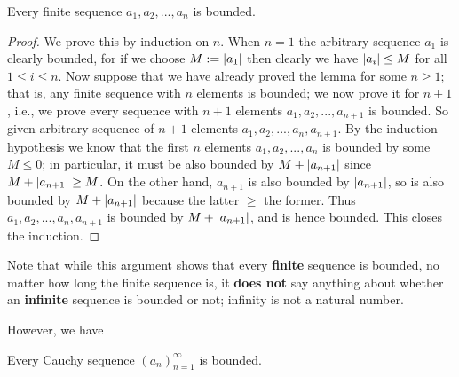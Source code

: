 \begin{lemma}  \label{lem 5.1.14}
Every finite sequence \(a_1, a_2, ..., a_n\) is bounded.
\end{lemma}

\begin{proof}
We prove this by induction on \(n\).
When \(n = 1\) the arbitrary sequence \(a_1\) is clearly bounded, for if we choose \(M := \lvert a_1\rvert\) then clearly we have \(\lvert a_i\rvert \le M\) for all \(1 \le i \le n\).
Now suppose that we have already proved the lemma for some \(n \ge 1\);
that is, any finite sequence with \(n\) elements is bounded;
we now prove it for \(n + 1\), i.e., we prove every sequence with \(n + 1\) elements \(a_1, a_2, ..., a_{n + 1}\) is bounded.
So given arbitrary sequence of \(n + 1\) elements \(a_1, a_2, ..., a_n, a_{n + 1}\).
By the induction hypothesis we know that the first \(n\) elements \(a_1, a_2, ..., a_n\) is bounded by some \(M \le 0\);
in particular, it must be also bounded by \(M + \lvert a_{n + 1}\rvert\) since \(M + \lvert a_{n + 1}\rvert \ge M\).
On the other hand, \(a_{n + 1}\) is also bounded by \(\lvert a_{n + 1}\rvert\), so is also bounded by \(M + \lvert a_{n + 1}\rvert\) because the latter \(\ge\) the former.
Thus \(a_1, a_2, ... , a_n, a_{n + 1}\) is bounded by \(M +  \lvert a_{n + 1}\rvert\), and is hence bounded.
This closes the induction.
\end{proof}

\begin{note}
Note that while this argument shows that every \textbf{finite} sequence is bounded, no matter how long the finite sequence is, it \textbf{does not} say anything about whether an \textbf{infinite} sequence is bounded or not;
infinity is not a natural number.
\end{note}

However, we have
\begin{lemma}  \label{lem 5.1.15}
Every Cauchy sequence \((a_n)_{n = 1}^{\infty}\) is bounded.
\end{lemma}

